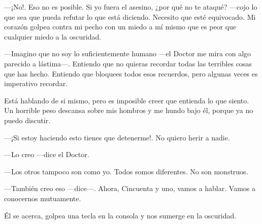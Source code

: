 ---¡No!. Eso no es posible. Si yo fuera el asesino, ¿por qué no te
ataqué? ---cojo lo que sea que pueda refutar lo que está
diciendo. Necesito que esté equivocado. Mi corazón golpea contra mi
pecho con un miedo a mí mismo que es peor que cualquier miedo a la
oscuridad.

---Imagino que no soy lo suficientemente humano ---el Doctor me mira con
algo parecido a lástima---. Entiendo que no quieras recordar todas las
terribles cosas que has hecho. Entiendo que bloquees todos esos
recuerdos, pero algunas veces es imperativo recordar.

Está hablando de si mismo, pero es imposible creer que entienda lo que
siento. Un horrible peso descansa sobre mis hombros y me hundo bajo él,
porque ya no puedo discutir.

---¡Si estoy haciendo esto tienes que detenerme!. No quiero herir a
nadie.

---Lo creo ---dice el Doctor.

---Los otros tampoco son como yo. Todos somos diferentes. No son
monstruos.

---También creo eso ---dice---. Ahora, Cincuenta y uno, vamos a
hablar. Vamos a conocernos mutuamente.

Él se acerca, golpea una tecla en la consola y nos sumerge en la
oscuridad.